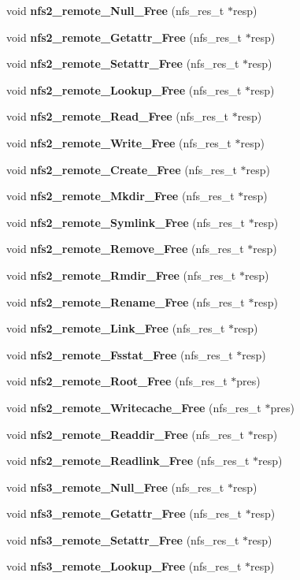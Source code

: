 \begin{CompactItemize}
\item 
void {\bf nfs2\_\-remote\_\-Null\_\-Free} (nfs\_\-res\_\-t $\ast$resp)
\item 
void {\bf nfs2\_\-remote\_\-Getattr\_\-Free} (nfs\_\-res\_\-t $\ast$resp)
\item 
void {\bf nfs2\_\-remote\_\-Setattr\_\-Free} (nfs\_\-res\_\-t $\ast$resp)
\item 
void {\bf nfs2\_\-remote\_\-Lookup\_\-Free} (nfs\_\-res\_\-t $\ast$resp)
\item 
void {\bf nfs2\_\-remote\_\-Read\_\-Free} (nfs\_\-res\_\-t $\ast$resp)
\item 
void {\bf nfs2\_\-remote\_\-Write\_\-Free} (nfs\_\-res\_\-t $\ast$resp)
\item 
void {\bf nfs2\_\-remote\_\-Create\_\-Free} (nfs\_\-res\_\-t $\ast$resp)
\item 
void {\bf nfs2\_\-remote\_\-Mkdir\_\-Free} (nfs\_\-res\_\-t $\ast$resp)
\item 
void {\bf nfs2\_\-remote\_\-Symlink\_\-Free} (nfs\_\-res\_\-t $\ast$resp)
\item 
void {\bf nfs2\_\-remote\_\-Remove\_\-Free} (nfs\_\-res\_\-t $\ast$resp)
\item 
void {\bf nfs2\_\-remote\_\-Rmdir\_\-Free} (nfs\_\-res\_\-t $\ast$resp)
\item 
void {\bf nfs2\_\-remote\_\-Rename\_\-Free} (nfs\_\-res\_\-t $\ast$resp)
\item 
void {\bf nfs2\_\-remote\_\-Link\_\-Free} (nfs\_\-res\_\-t $\ast$resp)
\item 
void {\bf nfs2\_\-remote\_\-Fsstat\_\-Free} (nfs\_\-res\_\-t $\ast$resp)
\item 
void {\bf nfs2\_\-remote\_\-Root\_\-Free} (nfs\_\-res\_\-t $\ast$pres)
\item 
void {\bf nfs2\_\-remote\_\-Writecache\_\-Free} (nfs\_\-res\_\-t $\ast$pres)
\item 
void {\bf nfs2\_\-remote\_\-Readdir\_\-Free} (nfs\_\-res\_\-t $\ast$resp)
\item 
void {\bf nfs2\_\-remote\_\-Readlink\_\-Free} (nfs\_\-res\_\-t $\ast$resp)
\item 
void {\bf nfs3\_\-remote\_\-Null\_\-Free} (nfs\_\-res\_\-t $\ast$resp)
\item 
void {\bf nfs3\_\-remote\_\-Getattr\_\-Free} (nfs\_\-res\_\-t $\ast$resp)
\item 
void {\bf nfs3\_\-remote\_\-Setattr\_\-Free} (nfs\_\-res\_\-t $\ast$resp)
\item 
void {\bf nfs3\_\-remote\_\-Lookup\_\-Free} (nfs\_\-res\_\-t $\ast$resp)

\end{CompactItemize}
